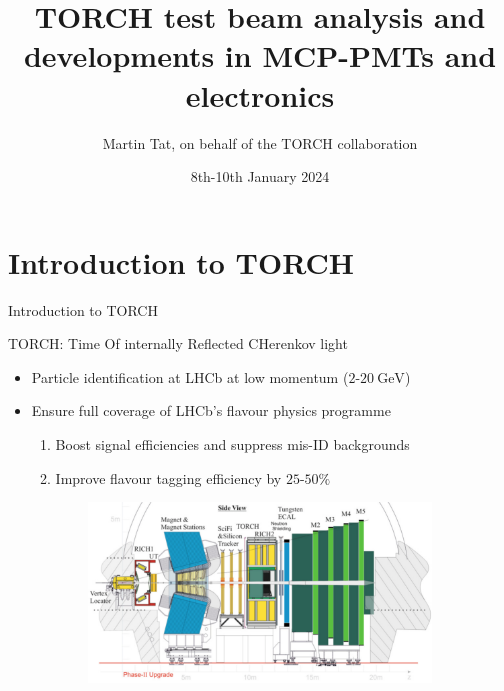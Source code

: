 \documentclass[xcolor={dvipsnames}]{beamer}
\title[LHCb-UK RAL]{TORCH test beam analysis and developments in MCP-PMTs and electronics}
\author[Martin Tat]{Martin Tat, on behalf of the TORCH collaboration}
\institute[University of Oxford]{\normalsize LHCb-UK annual meeting, RAL}
\date{8th-10th January 2024}
\begin{document}
\begin{frame}
  \titlepage
\end{frame}


\section{Introduction to TORCH}
\begin{frame}{Introduction to TORCH}
  \vspace{0.0cm}
  \begin{center}
    {\large TORCH: Time Of internally Reflected CHerenkov light}
  \end{center}
  \begin{itemize}
    \setlength\itemsep{0.3em}
    \item{Particle identification at LHCb at low momentum ($2$-$\SI{20}{\giga\eV}$)}
    \item{Ensure full coverage of LHCb's flavour physics programme}
    \begin{enumerate}
      \setlength\itemsep{0.3em}
      \item{Boost signal efficiencies and suppress mis-ID backgrounds}
      \item{Improve flavour tagging efficiency by $25$-$50\%$}
    \end{enumerate}
  \end{itemize}
  \begin{figure}
    \centering
    \begin{subfigure}{0.57\textwidth}
      \centering
      \includegraphics[width = 1.0\textwidth]{Figs/TORCH_location.png}
    \end{subfigure}%

\end{figure}
\end{frame}
\end{document}
